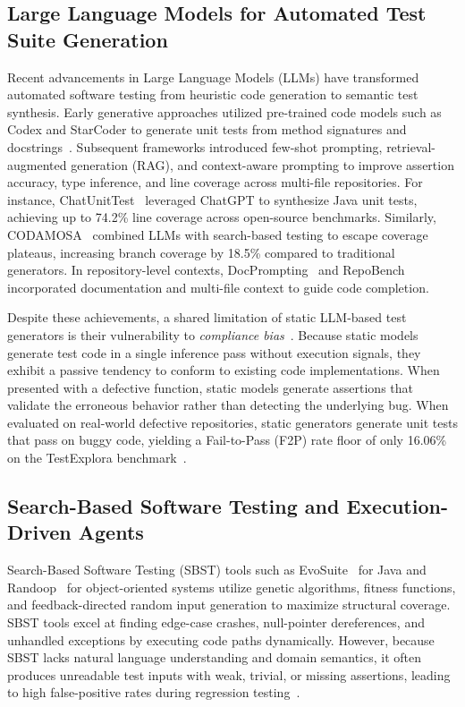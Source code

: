 \documentclass[conference]{IEEEtran}
\begin{document}
\subsection{Large Language Models for Automated Test Suite Generation}
Recent advancements in Large Language Models (LLMs) have transformed automated software testing from heuristic code generation to semantic test synthesis. Early generative approaches utilized pre-trained code models such as Codex and StarCoder to generate unit tests from method signatures and docstrings~\cite{bareiss2022code}. Subsequent frameworks introduced few-shot prompting, retrieval-augmented generation (RAG), and context-aware prompting to improve assertion accuracy, type inference, and line coverage across multi-file repositories. For instance, ChatUnitTest~\cite{xie2023chatunitest} leveraged ChatGPT to synthesize Java unit tests, achieving up to 74.2\% line coverage across open-source benchmarks. Similarly, CODAMOSA~\cite{lemieux2023codamosa} combined LLMs with search-based testing to escape coverage plateaus, increasing branch coverage by 18.5\% compared to traditional generators. In repository-level contexts, DocPrompting~\cite{docprompting} and RepoBench~\cite{repobench} incorporated documentation and multi-file context to guide code completion.

Despite these achievements, a shared limitation of static LLM-based test generators is their vulnerability to \textit{compliance bias}~\cite{testexplora}. Because static models generate test code in a single inference pass without execution signals, they exhibit a passive tendency to conform to existing code implementations. When presented with a defective function, static models generate assertions that validate the erroneous behavior rather than detecting the underlying bug. When evaluated on real-world defective repositories, static generators generate unit tests that pass on buggy code, yielding a Fail-to-Pass (F2P) rate floor of only 16.06\% on the TestExplora benchmark~\cite{testexplora}.

\subsection{Search-Based Software Testing and Execution-Driven Agents}
Search-Based Software Testing (SBST) tools such as EvoSuite~\cite{evosuite} for Java and Randoop~\cite{randoop} for object-oriented systems utilize genetic algorithms, fitness functions, and feedback-directed random input generation to maximize structural coverage. SBST tools excel at finding edge-case crashes, null-pointer dereferences, and unhandled exceptions by executing code paths dynamically. However, because SBST lacks natural language understanding and domain semantics, it often produces unreadable test inputs with weak, trivial, or missing assertions, leading to high false-positive rates during regression testing~\cite{siddiq2023exploratory, schafer2023empirical}.
\end{document}

